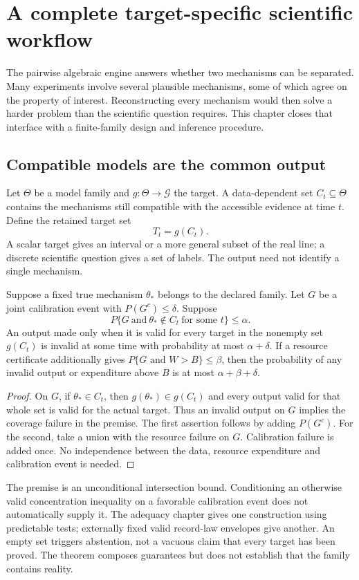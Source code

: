 \chapter{A complete target-specific scientific workflow}\label{workflow:suite}

The pairwise algebraic engine answers whether two mechanisms can be separated. Many experiments involve several plausible mechanisms, some of which agree on the property of interest. Reconstructing every mechanism would then solve a harder problem than the scientific question requires. This chapter closes that interface with a finite-family design and inference procedure.

\section{Compatible models are the common output}
Let $\Theta$ be a model family and $g:\Theta\to\mathcal G$ the target. A data-dependent set $C_t\subseteq\Theta$ contains the mechanisms still compatible with the accessible evidence at time $t$. Define the retained target set
\[
 T_t=g(C_t).
\]
A scalar target gives an interval or a more general subset of the real line; a discrete scientific question gives a set of labels. The output need not identify a single mechanism.

\begin{theorem}\label{workflow:composition}
Suppose a fixed true mechanism $\theta_*$ belongs to the declared family. Let $G$ be a joint calibration event with $P(G^c)\le\delta$. Suppose
\[
 P\{G\ \text{and}\ \theta_*\notin C_t\ \text{for some }t\}\le\alpha.
\]
An output made only when it is valid for every target in the nonempty set $g(C_t)$ is invalid at some time with probability at most $\alpha+\delta$. If a resource certificate additionally gives $P\{G\text{ and }W>B\}\le\beta$, then the probability of any invalid output or expenditure above $B$ is at most $\alpha+\beta+\delta$.
\end{theorem}
\begin{proof}
On $G$, if $\theta_*\in C_t$, then $g(\theta_*)\in g(C_t)$ and every output valid for that whole set is valid for the actual target. Thus an invalid output on $G$ implies the coverage failure in the premise. The first assertion follows by adding $P(G^c)$. For the second, take a union with the resource failure on $G$. Calibration failure is added once. No independence between the data, resource expenditure and calibration event is needed.
\end{proof}
The premise is an unconditional intersection bound. Conditioning an otherwise valid concentration inequality on a favorable calibration event does not automatically supply it. The adequacy chapter gives one construction using predictable tests; externally fixed valid record-law envelopes give another. An empty set triggers abstention, not a vacuous claim that every target has been proved. The theorem composes guarantees but does not establish that the family contains reality.

